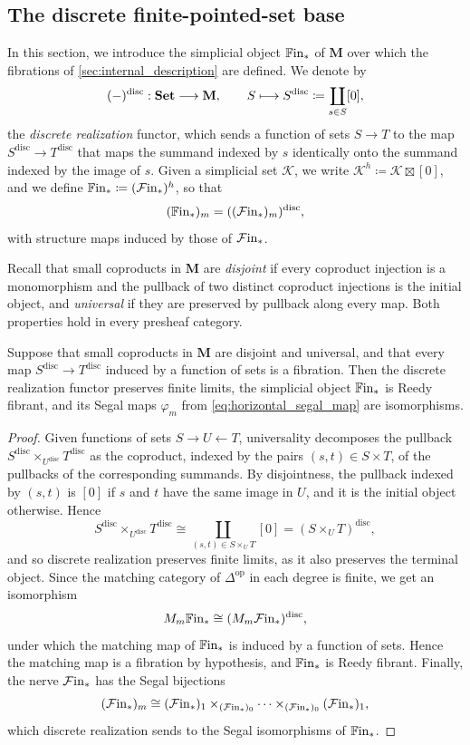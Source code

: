 \documentclass[10pt,reqno]{amsart}
\begin{document}
\subsection{The discrete finite-pointed-set base}
\label{subsec:discrete_base}

In this section, we introduce the simplicial object $\mathbb{F}\mathrm{in}_*$ of
$\mathbf M$ over which the fibrations of
\cref{sec:internal_description} are defined. We denote by
\[
(-)^{\mathrm{disc}}:\mathbf{Set}\longrightarrow\mathbf M,
\qquad
S\longmapsto S^{\mathrm{disc}}\coloneqq\coprod_{s\in S}[0],
\]
the \emph{discrete realization} functor, which sends a function of
sets $S\to T$ to the map $S^{\mathrm{disc}}\to T^{\mathrm{disc}}$
that maps the summand indexed by $s$ identically onto the summand
indexed by the image of $s$. Given a simplicial set $\mathcal K$,
we write $\mathcal K^h\coloneqq\mathcal K\boxtimes[0]$, and we define
$\mathbb{F}\mathrm{in}_*\coloneqq(\mathcal{F}\mathrm{in}_*)^h$, so that
\[
(\mathbb{F}\mathrm{in}_*)_m=((\mathcal{F}\mathrm{in}_*)_m)^{\mathrm{disc}},
\]
with structure maps induced by those of $\mathcal{F}\mathrm{in}_*$.

Recall that small coproducts in $\mathbf M$ are \emph{disjoint} if
every coproduct injection is a monomorphism and the pullback of two
distinct coproduct injections is the initial object, and
\emph{universal} if they are preserved by pullback along every map.
Both properties hold in every presheaf category.

\begin{proposition}
\label{prop:discrete_base}
Suppose that small coproducts in $\mathbf M$ are disjoint and
universal, and that every map
$S^{\mathrm{disc}}\to T^{\mathrm{disc}}$ induced by a function of
sets is a fibration. Then the discrete realization functor preserves
finite limits, the simplicial object $\mathbb{F}\mathrm{in}_*$ is Reedy fibrant,
and its Segal maps $\varphi_m$ from \eqref{eq:horizontal_segal_map}
are isomorphisms.
\end{proposition}
\begin{proof}
Given functions of sets $S\to U\leftarrow T$, universality
decomposes the pullback
$S^{\mathrm{disc}}\times_{U^{\mathrm{disc}}}T^{\mathrm{disc}}$ as the
coproduct, indexed by the pairs $(s,t)\in S\times T$, of the
pullbacks of the corresponding summands. By disjointness, the pullback
indexed by $(s,t)$ is $[0]$ if $s$ and $t$ have the same image
in $U$, and it is the initial object otherwise. Hence
\[
S^{\mathrm{disc}}\times_{U^{\mathrm{disc}}}T^{\mathrm{disc}}
\cong\coprod_{(s,t)\in S\times_U T}[0]
=(S\times_U T)^{\mathrm{disc}},
\]
and so discrete realization preserves finite limits, as it also
preserves the terminal object. Since the matching category of
$\Delta^{\mathrm{op}}$ in each degree is finite, we get an
isomorphism
\[
M_m\mathbb{F}\mathrm{in}_*\cong(M_m\mathcal{F}\mathrm{in}_*)^{\mathrm{disc}},
\]
under which the matching map of $\mathbb{F}\mathrm{in}_*$ is induced by a function
of sets. Hence the matching map is a fibration by hypothesis, and
$\mathbb{F}\mathrm{in}_*$ is Reedy fibrant. Finally, the nerve $\mathcal{F}\mathrm{in}_*$ has the
Segal bijections
\[
(\mathcal{F}\mathrm{in}_*)_m\cong(\mathcal{F}\mathrm{in}_*)_1
\times_{(\mathcal{F}\mathrm{in}_*)_0}\cdots\times_{(\mathcal{F}\mathrm{in}_*)_0}(\mathcal{F}\mathrm{in}_*)_1,
\]
which discrete realization sends to the Segal isomorphisms of
$\mathbb{F}\mathrm{in}_*$.
\end{proof}
\end{document}
